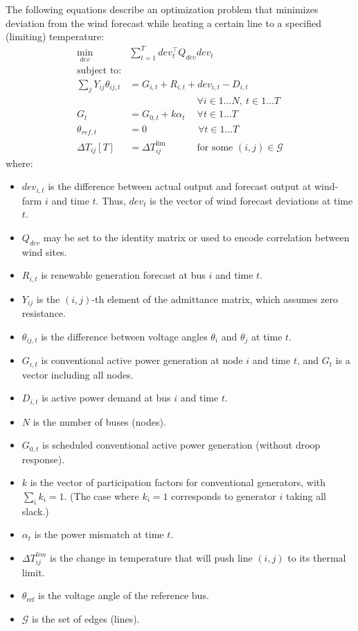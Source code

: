 \documentclass[conference]{IEEEtran}
\begin{document}
The following equations describe an optimization problem that
minimizes deviation from the wind forecast while heating a certain
line to a specified (limiting) temperature:
\begin{subequations}\label{I:all}
\begin{align}
\label{I:obj}\underset{dev}{\min} \quad & \sum_{t=1}^{T} dev_t^\top Q_{dev} dev_t \\
\nonumber \text{subject to:} & \\
\label{I:flow} \sum_j Y_{ij} \theta_{ij,t} & = G_{i,t} + R_{i,t} +
dev_{i,t} - D_{i,t} \\[-8pt]
\nonumber &\qquad\qquad\qquad\quad \forall i \in 1... N,~t\in 1... T \\%
\label{I:conv} G_t &= G_{0,t} + k\alpha_t \quad\: \forall t\in 1\ldots T \\
\label{I:slack} \theta_{ref,t} & = 0 \qquad\qquad\quad\; \forall t\in 1\ldots T \\
\label{I:lim} \Delta T_{ij}[T] &= \Delta T_{ij}^\text{lim}\qquad\quad\: \text{for some }(i,j)\in \mathcal{G}
\end{align}
\end{subequations}
where:
\begin{itemize}
\itemsep1pt\parskip0pt
\item $dev_{i,t}$ is the difference between actual output and forecast output at wind-farm $i$ and time $t$. Thus, $dev_t$ is the vector of wind forecast deviations at time $t$.
\item $Q_{dev}$ may be set to the identity matrix or used to encode correlation between wind sites.
\item $R_{i,t}$ is renewable generation forecast at bus $i$ and time $t$.
\item $Y_{ij}$ is the $(i,j)$-th element of the admittance matrix, which assumes zero resistance.
\item $\theta_{ij,t}$ is the difference between voltage angles $\theta_i$ and $\theta_j$ at time $t$.
\item $G_{i,t}$ is conventional active power generation at node $i$ and time $t$, and $G_t$ is a vector including all nodes.
\item $D_{i,t}$ is active power demand at bus $i$ and time $t$.
\item $N$ is the number of buses (nodes).
\item $G_{0,t}$ is scheduled conventional active power generation (without droop response).
\item $k$ is the vector of participation factors for conventional generators, with $\sum_i k_i = 1$. (The case where $k_i=1$ corresponds to generator $i$ taking all slack.)
\item $\alpha_t$ is the power mismatch at time $t$.
\item $\Delta T_{ij}^{lim}$ is the change in temperature that will push line $(i,j)$ to its thermal limit.
\item $\theta_\text{ref}$ is the voltage angle of the reference bus.
\item $\mathcal{G}$ is the set of edges (lines).
\end{itemize}
\end{document}

